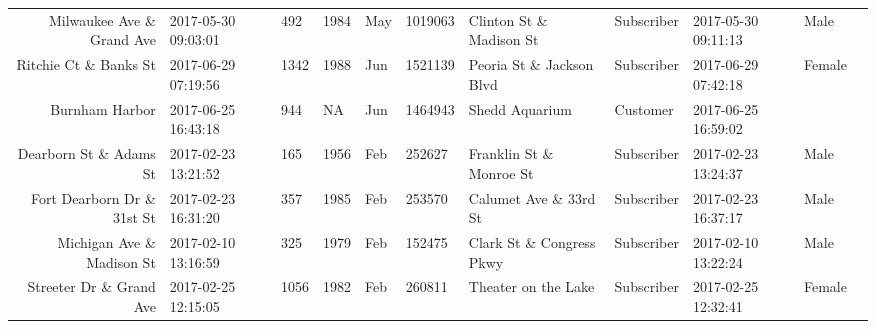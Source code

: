 \documentclass[11pt]{article}
\begin{document}
\begin{tabular}{r|llllllllll}
	 Milwaukee Ave \& Grand Ave         & 2017-05-30 09:03:01                 &  492                                & 1984                                & May                                 & 1019063                             & Clinton St \& Madison St           & Subscriber                          & 2017-05-30 09:11:13                 & Male                               \\
	 Ritchie Ct \& Banks St             & 2017-06-29 07:19:56                 & 1342                                & 1988                                & Jun                                 & 1521139                             & Peoria St \& Jackson Blvd          & Subscriber                          & 2017-06-29 07:42:18                 & Female                             \\
	 Burnham Harbor                    & 2017-06-25 16:43:18               &  944                              &   NA                              & Jun                               & 1464943                           & Shedd Aquarium                    & Customer                          & 2017-06-25 16:59:02               &                                  \\
	 Dearborn St \& Adams St            & 2017-02-23 13:21:52                 &  165                                & 1956                                & Feb                                 &  252627                             & Franklin St \& Monroe St           & Subscriber                          & 2017-02-23 13:24:37                 & Male                               \\
	 Fort Dearborn Dr \& 31st St        & 2017-02-23 16:31:20                 &  357                                & 1985                                & Feb                                 &  253570                             & Calumet Ave \& 33rd St             & Subscriber                          & 2017-02-23 16:37:17                 & Male                               \\
	 Michigan Ave \& Madison St         & 2017-02-10 13:16:59                 &  325                                & 1979                                & Feb                                 &  152475                             & Clark St \& Congress Pkwy          & Subscriber                          & 2017-02-10 13:22:24                 & Male                               \\
	 Streeter Dr \& Grand Ave         & 2017-02-25 12:15:05               & 1056                              & 1982                              & Feb                               &  260811                           & Theater on the Lake               & Subscriber                        & 2017-02-25 12:32:41               & Female                           \\

\end{tabular}
\end{document}
